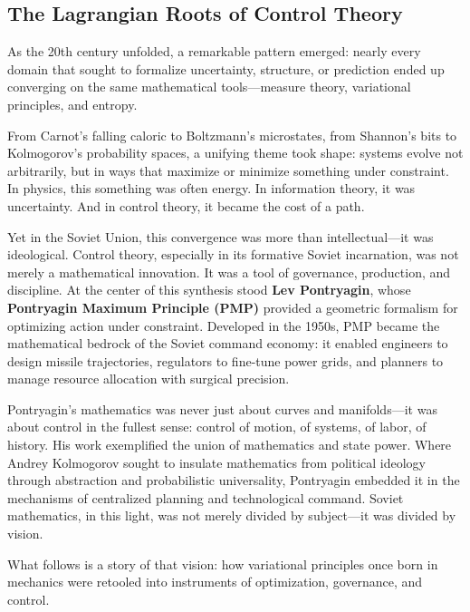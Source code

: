 \subsection{The Lagrangian Roots of Control Theory}

As the 20th century unfolded, a remarkable pattern emerged: nearly every domain that sought to formalize uncertainty, structure, or prediction ended up converging on the same mathematical tools—measure theory, variational principles, and entropy.

From Carnot’s falling caloric to Boltzmann’s microstates, from Shannon’s bits to Kolmogorov’s probability spaces, a unifying theme took shape: systems evolve not arbitrarily, but in ways that maximize or minimize something under constraint. In physics, this something was often energy. In information theory, it was uncertainty. And in control theory, it became the cost of a path.

Yet in the Soviet Union, this convergence was more than intellectual—it was ideological. Control theory, especially in its formative Soviet incarnation, was not merely a mathematical innovation. It was a tool of governance, production, and discipline. At the center of this synthesis stood \textbf{Lev Pontryagin}, whose \textbf{Pontryagin Maximum Principle (PMP)} provided a geometric formalism for optimizing action under constraint. Developed in the 1950s, PMP became the mathematical bedrock of the Soviet command economy: it enabled engineers to design missile trajectories, regulators to fine-tune power grids, and planners to manage resource allocation with surgical precision.

Pontryagin’s mathematics was never just about curves and manifolds—it was about control in the fullest sense: control of motion, of systems, of labor, of history. His work exemplified the union of mathematics and state power. Where Andrey Kolmogorov sought to insulate mathematics from political ideology through abstraction and probabilistic universality, Pontryagin embedded it in the mechanisms of centralized planning and technological command. Soviet mathematics, in this light, was not merely divided by subject—it was divided by vision.

What follows is a story of that vision: how variational principles once born in mechanics were retooled into instruments of optimization, governance, and control.